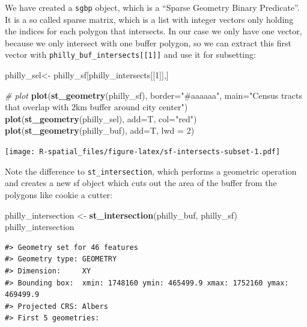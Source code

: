 \documentclass[
]{book}
\newenvironment{Shaded}{\begin{snugshade}}{\end{snugshade}}
\newcommand{\AttributeTok}[1]{\textcolor[rgb]{0.13,0.29,0.53}{#1}}
\newcommand{\CommentTok}[1]{\textcolor[rgb]{0.56,0.35,0.01}{\textit{#1}}}
\newcommand{\DecValTok}[1]{\textcolor[rgb]{0.00,0.00,0.81}{#1}}
\newcommand{\FunctionTok}[1]{\textcolor[rgb]{0.13,0.29,0.53}{\textbf{#1}}}
\newcommand{\NormalTok}[1]{#1}
\newcommand{\OtherTok}[1]{\textcolor[rgb]{0.56,0.35,0.01}{#1}}
\newcommand{\StringTok}[1]{\textcolor[rgb]{0.31,0.60,0.02}{#1}}
\begin{document}
We have created a \texttt{sgbp} object, which is a ``Sparse Geometry Binary Predicate''. It is a so called sparse matrix, which is a list with integer vectors only holding the indices for each polygon that intersects. In our case we only have one vector, because we only intersect with one buffer polygon, so we can extract this first vector with \texttt{philly\_buf\_intersects{[}{[}1{]}{]}} and use it for subsetting:

\begin{Shaded}
\begin{Highlighting}[]
\NormalTok{philly\_sel}\OtherTok{\textless{}{-}}\NormalTok{ philly\_sf[philly\_intersects[[}\DecValTok{1}\NormalTok{]],]}

\CommentTok{\# plot}
\FunctionTok{plot}\NormalTok{(}\FunctionTok{st\_geometry}\NormalTok{(philly\_sf), }\AttributeTok{border=}\StringTok{"\#aaaaaa"}\NormalTok{, }\AttributeTok{main=}\StringTok{"Census tracts that overlap with 2km buffer around city center"}\NormalTok{)}
\FunctionTok{plot}\NormalTok{(}\FunctionTok{st\_geometry}\NormalTok{(philly\_sel), }\AttributeTok{add=}\NormalTok{T, }\AttributeTok{col=}\StringTok{"red"}\NormalTok{)}
\FunctionTok{plot}\NormalTok{(}\FunctionTok{st\_geometry}\NormalTok{(philly\_buf), }\AttributeTok{add=}\NormalTok{T, }\AttributeTok{lwd =} \DecValTok{2}\NormalTok{)}
\end{Highlighting}
\end{Shaded}

\texttt{[image: R-spatial\_files/figure-latex/sf-intersects-subset-1.pdf]}

Note the difference to \texttt{st\_intersection}, which performs a geometric operation and creates a new sf object which cuts out the area of the buffer from the polygons like cookie a cutter:

\begin{Shaded}
\begin{Highlighting}[]
\NormalTok{philly\_intersection }\OtherTok{\textless{}{-}} \FunctionTok{st\_intersection}\NormalTok{(philly\_buf, philly\_sf)}
\NormalTok{philly\_intersection}
\end{Highlighting}
\end{Shaded}

\begin{verbatim}
#> Geometry set for 46 features 
#> Geometry type: GEOMETRY
#> Dimension:     XY
#> Bounding box:  xmin: 1748160 ymin: 465499.9 xmax: 1752160 ymax: 469499.9
#> Projected CRS: Albers
#> First 5 geometries:
\end{verbatim}
\end{document}
